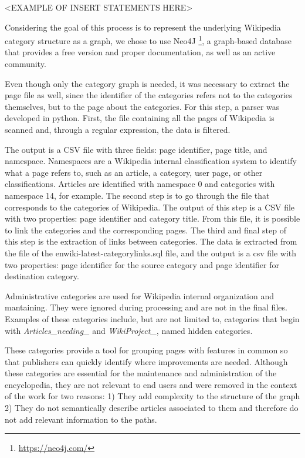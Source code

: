 <EXAMPLE OF INSERT STATEMENTS HERE>

Considering the goal of this process is to represent the underlying Wikipedia category structure as a graph, we chose to use Neo4J \footnote {\url{https://neo4j.com/}}, a graph-based database that provides a free version and proper documentation, as well as an active community. 

Even though only the category graph is needed, it was necessary to extract the page file as well, since the identifier of the categories refers not to the categories themselves, but to the page about the categories. For this step, a parser was developed in python. First, the file containing all the pages of Wikipedia is scanned and, through a regular expression, the data is filtered.

The output is a CSV file with three fields: page identifier, page title, and namespace. Namespaces are a Wikipedia internal classification system to identify what a page refers to, such as an article, a category, user page, or other classifications. Articles are identified with namespace 0 and categories with namespace 14, for example.
The second step is to go through the file that corresponds to the categories of Wikipedia. The output of this step is a CSV file with two properties: page identifier and category title. From this file, it is possible to link the categories and the corresponding pages. The third and final step of this step is the extraction of links between categories. The data is extracted from the file of the enwiki-latest-categorylinks.sql file, and the output is a csv file with two properties: page identifier for the source category and page identifier for destination category.

Administrative categories are used for Wikipedia internal organization and mantaining. They were ignored during processing and are not in the final files. Examples of these categories include, but are not limited to, categories that begin with \textit{Articles\_needing\_} and \textit{WikiProject\_}, named hidden categories.


These categories provide a tool for grouping pages with features in common so that publishers can quickly identify where improvements are needed. Although these categories are essential for the maintenance and administration of the encyclopedia, they are not relevant to end users and were removed in the context of the work for two reasons: 1) They add complexity to the structure of the graph 2) They do not semantically describe articles associated to them and therefore do not add relevant information to the paths.


